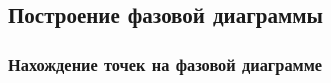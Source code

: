 \documentclass[pdf,hyperref={unicode}]{beamer}
\begin{document}
\subsection{Построение фазовой диаграммы}


\begin{frame}
\transdissolve[duration=0.2]
\frametitle{Нахождение точек на фазовой диаграмме}
\begin{columns}


\begin{column}{0.55\linewidth}

\begin{figure}[h]
\end{figure}

\end{column}

\begin{column}{0.4\linewidth}


\end{column}
\end{columns}
\end{frame}
\end{document}
